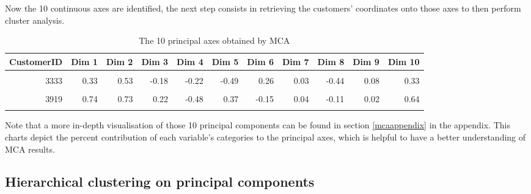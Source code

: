 \documentclass[
]{book}
\begin{document}
Now the 10 continuous axes are identified, the next step consists in retrieving the customers' coordinates onto those axes to then perform cluster analysis.

\begin{table}[H]

\caption{\label{tab:unnamed-chunk-26}The 10 principal axes obtained by MCA}
\centering
\begin{tabular}[t]{rrrrrrrrrrr}
\toprule
CustomerID & Dim 1 & Dim 2 & Dim 3 & Dim 4 & Dim 5 & Dim 6 & Dim 7 & Dim 8 & Dim 9 & Dim 10\\
\midrule
\cellcolor{gray!6}{448} & \cellcolor{gray!6}{0.64} & \cellcolor{gray!6}{-0.09} & \cellcolor{gray!6}{0.35} & \cellcolor{gray!6}{0.69} & \cellcolor{gray!6}{-0.34} & \cellcolor{gray!6}{-0.22} & \cellcolor{gray!6}{0.11} & \cellcolor{gray!6}{-0.20} & \cellcolor{gray!6}{0.15} & \cellcolor{gray!6}{-0.28}\\
3333 & 0.33 & 0.53 & -0.18 & -0.22 & -0.49 & 0.26 & 0.03 & -0.44 & 0.08 & 0.33\\
\cellcolor{gray!6}{2267} & \cellcolor{gray!6}{0.15} & \cellcolor{gray!6}{-0.59} & \cellcolor{gray!6}{0.07} & \cellcolor{gray!6}{-0.09} & \cellcolor{gray!6}{-0.03} & \cellcolor{gray!6}{-0.27} & \cellcolor{gray!6}{-0.12} & \cellcolor{gray!6}{-0.20} & \cellcolor{gray!6}{-0.13} & \cellcolor{gray!6}{0.02}\\
3919 & 0.74 & 0.73 & 0.22 & -0.48 & 0.37 & -0.15 & 0.04 & -0.11 & 0.02 & 0.64\\
\cellcolor{gray!6}{3990} & \cellcolor{gray!6}{-0.65} & \cellcolor{gray!6}{0.37} & \cellcolor{gray!6}{0.43} & \cellcolor{gray!6}{0.05} & \cellcolor{gray!6}{-0.50} & \cellcolor{gray!6}{0.35} & \cellcolor{gray!6}{-0.14} & \cellcolor{gray!6}{-0.23} & \cellcolor{gray!6}{-0.22} & \cellcolor{gray!6}{-0.11}\\
\bottomrule
\end{tabular}
\end{table}

Note that a more in-depth visualisation of those 10 principal components can be found in section \ref{mcaappendix} in the appendix. This charts depict the percent contribution of each variable's categories to the principal axes, which is helpful to have a better understanding of MCA results.

\hypertarget{hierarchical-clustering-on-principal-components}{%
\subsection{Hierarchical clustering on principal components}\label{hierarchical-clustering-on-principal-components}}
\end{document}

